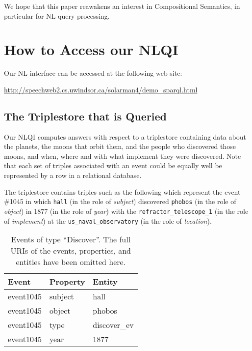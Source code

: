 \documentclass[../main.tex]{subfiles}
\begin{document}
\begin{refsection}
We hope that this paper reawakens an interest in Compositional Semantics, in particular for NL query processing.

\section{How to Access our NLQI}
\label{webist2019conf:access}

Our NL interface can be accessed at the following web site:

\begin{center}
	\url{http://speechweb2.cs.uwindsor.ca/solarman4/demo_sparql.html}
\end{center}

\subsection{The Triplestore that is Queried}
\label{webist2019conf:triplestore}
Our NLQI computes answers with respect to a triplestore containing data about the planets, the moons that orbit them, and the people who discovered those moons, and when, where and with what implement they were discovered. Note that each set of triples associated with an event could be equally well be represented by a row in a relational database.

The triplestore contains triples such as the following which represent the event \#1045 in which \texttt{hall} (in the role of \textit{subject}) discovered \texttt{phobos} (in the role of \textit{object}) in 1877 (in the role of \textit{year}) with the \texttt{refractor\_telescope\_1} (in the role of \textit{implement})  at the \texttt{us\_naval\_observatory} (in the role of \textit{location}).

\begin{table}[h]
	\caption{Events of type ``Discover''. The full URIs of the events, properties, and entities have been omitted here.}
	\label{webist2019conf:evdiscover}
	\centering
	\begin{tabular}{lll}
		\toprule
		Event & Property & Entity \\
		\midrule
		event1045 &
		subject &
		hall \\

		event1045 &
		object &
		phobos \\

		event1045 &
		type &
		discover\_ev \\

		event1045 &
		year &
		1877 \\


\end{tabular}
\end{table}
\end{refsection}
\end{document}
